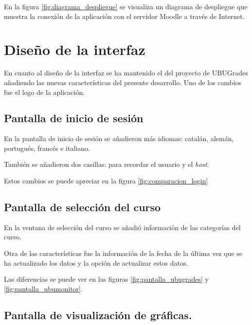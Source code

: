 En la figura \ref{fig:diagrama_despliegue} se visualiza un diagrama de despliegue que muestra la conexión de la aplicación con el servidor Moodle a través de Internet.




\section{Diseño de la interfaz}
En cuanto al diseño de la interfaz se ha mantenido el del proyecto de UBUGrades añadiendo las nuevas características del presente desarrollo. Uno de los cambios fue el logo de la aplicación.


\subsection{Pantalla de inicio de sesión}
En la pantalla de inicio de sesión se añadieron más idiomas: catalán, alemán, portugués, francés e italiano.

También se añadieron dos casillas: para recordar el usuario y el \textit{host}. 

Estos cambios se puede apreciar en la figura \ref{fig:comparacion_login}

\subsection{Pantalla de selección del curso}

En la ventana de selección del curso se añadió información de las categorías del curso.

Otra de las características fue la información de la fecha de la última vez que se ha actualizado los datos y la opción de actualizar estos datos.

Las diferencias se puede ver en las  figuras \ref{fig:pantalla_ubugrades} y \ref{fig:pantalla_ubumonitor}.



\subsection{Pantalla de visualización de gráficas.}

